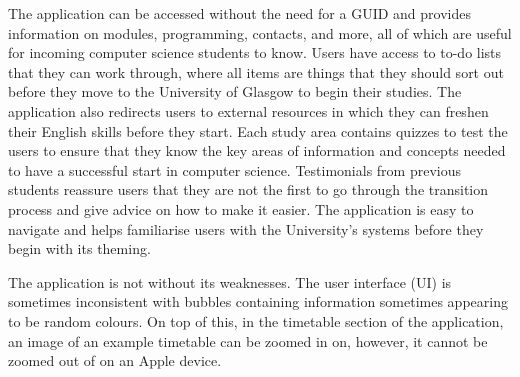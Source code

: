 \documentclass{l4proj}
\begin{document}
The application can be accessed without the need for a GUID and provides information on modules,  programming,  contacts,  and more,  all of which are useful for incoming computer science students to know. Users have access to to-do lists that they can work through,  where all items are things that they should sort out before they move to the University of Glasgow to begin their studies. The application also redirects users to external resources in which they can freshen their English skills before they start. Each study area contains quizzes to test the users to ensure that they know the key areas of information and concepts needed to have a successful start in computer science. Testimonials from previous students reassure users that they are not the first to go through the transition process and give advice on how to make it easier. The application is easy to navigate and helps familiarise users with the University's systems before they begin with its theming.

The application is not without its weaknesses. The user interface (UI) is sometimes inconsistent with bubbles containing information sometimes appearing to be random colours. On top of this,  in the timetable section of the application,  an image of an example timetable can be zoomed in on,  however,  it cannot be zoomed out of on an Apple device.
\end{document}
